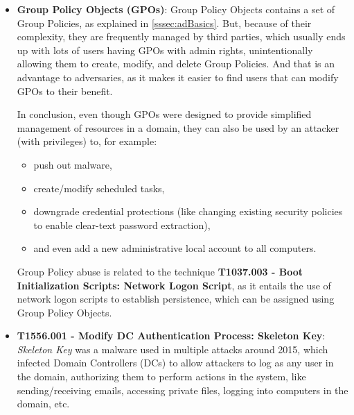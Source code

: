 \begin{itemize}
\item \textbf{Group Policy Objects (GPOs)}: Group Policy Objects contains a set of Group Policies, as explained in \ref{sssec:adBasics}. But, because of their complexity, they are frequently managed by third parties, which usually ends up with lots of users having GPOs with admin rights, unintentionally allowing them to create, modify, and delete Group Policies. And that is an advantage to adversaries, as it makes it easier to find users that can modify GPOs to their benefit. 

In conclusion, even though GPOs were designed to provide simplified management of resources in a domain, they can also be used by an attacker (with privileges)\cite{GPOAttack} to, for example: 
\begin{itemize}
\item push out malware,
\item create/modify scheduled tasks,
\item downgrade credential protections (like changing existing security policies to enable clear-text password extraction),
\item and even add a new administrative local account to all computers.
\end{itemize}

Group Policy abuse is related to the technique \textbf{T1037.003 - Boot Initialization Scripts: Network Logon Script}\cite{MitreGPOs}, as it entails the use of network logon scripts to establish persistence, which can be assigned using Group Policy Objects. 


\item \textbf{T1556.001 - Modify DC Authentication Process: Skeleton Key}: \textit{Skeleton Key}\cite{SkeletonKey} was a malware used in multiple attacks around 2015, which infected Domain Controllers (DCs) to allow attackers to log as any user in the domain, authorizing them to perform actions in the system, like sending/receiving emails, accessing private files, logging into computers in the domain, etc.


\end{itemize}
